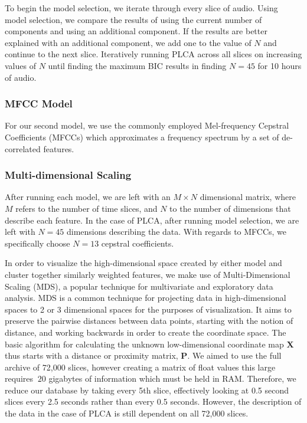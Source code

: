 \documentclass[a4paper,10pt,final]{ThesisStyle}
\begin{document}
To begin the model selection, we iterate through every slice of audio.  Using model selection, we compare the results of using the current number of components and using an additional component.  If the results are better explained with an additional component, we add one to the value of $N$ and continue to the next slice. Iteratively running PLCA across all slices on increasing values of $N$ until finding the maximum BIC results in finding $N=45$ for 10 hours of audio.  

\subsubsection{MFCC Model}
For our second model, we use the commonly employed Mel-frequency Cepstral Coefficients (MFCCs) which approximates a frequency spectrum by a set of de-correlated features.  

\subsubsection{Multi-dimensional Scaling}
After running each model, we are left with an $M \times N$ dimensional matrix, where $M$ refers to the number of time slices, and $N$ to the number of dimensions that describe each feature.  In the case of PLCA, after running model selection, we are left with $N=45$ dimensions describing the data.  With regards to MFCCs, we specifically choose $N=13$ cepstral coefficients.  

In order to visualize the high-dimensional space created by either model and cluster together similarly weighted features, we make use of Multi-Dimensional Scaling (MDS), a popular technique for multivariate and exploratory data analysis. MDS is a common technique for projecting data in high-dimensional spaces to 2 or 3 dimensional spaces for the purposes of visualization.  It aims to preserve the pairwise distances between data points, starting with the notion of distance, and working backwards in order to create the coordinate space.  The basic algorithm for calculating the unknown low-dimensional coordinate map $\mathbf{X}$ thus starts with a distance or proximity matrix, $\mathbf{P}$.  We aimed to use the full archive of 72,000 slices, however creating a matrix of float values this large requires $~20$ gigabytes of information which must be held in RAM.  Therefore, we reduce our database by taking every 5th slice, effectively looking at 0.5 second slices every 2.5 seconds rather than every 0.5 seconds.  However, the description of the data in the case of PLCA is still dependent on all 72,000 slices.
  
\end{document}
